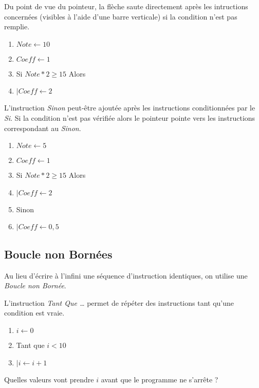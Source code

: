 \documentclass{article}
\begin{document}
Du point de vue du pointeur, la flèche saute directement après les intructions concernées (visibles à l'aide d'une barre verticale) si la condition n'est pas remplie.

\begin{example}
\hfill
\begin{enumerate}
\item $Note \leftarrow 10$
\item $Coeff \leftarrow 1$
\item Si $Note * 2 \geq 15$ Alors
\item $\vert Coeff \leftarrow 2$
\end{enumerate}
\end{example}

L'instruction \emph{Sinon} peut-être ajoutée après les instructions conditionnées par le \emph{Si}. Si la condition n'est pas vérifiée alors le pointeur pointe vers les instructions correspondant au \emph{Sinon}.

\begin{example}
\hfill
\begin{enumerate}
\item $Note \leftarrow 5$
\item $Coeff \leftarrow 1$
\item Si $Note * 2 \geq 15$ Alors
\item $\vert Coeff \leftarrow 2$
\item Sinon
\item $\vert Coeff \leftarrow 0,5$
\end{enumerate}
\end{example}

\subsection{Boucle non Bornées}
Au lieu d'écrire à l'infini une séquence d'instruction identiques, on utilise une \emph{Boucle non Bornée}.

L'instruction \emph{Tant Que \dots} permet de répéter des instructions tant qu'une condition est vraie.

\begin{example}
\hfill
\begin{enumerate}
\item $i \leftarrow 0$
\item Tant que $i < 10$
\item $\vert i \leftarrow i + 1$ 
\end{enumerate}

Quelles valeurs vont prendre $i$ avant que le programme ne s'arrête ?
\end{example}
\end{document}
